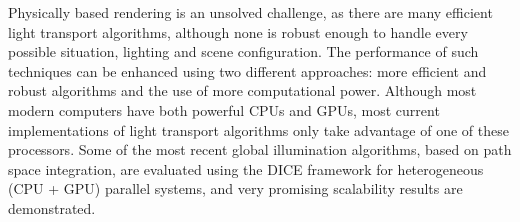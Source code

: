 Physically based rendering is an unsolved challenge, as there are many efficient light transport algorithms, although none is robust enough to handle every possible situation, lighting and scene configuration. The performance of such techniques can be enhanced using two different approaches: more efficient and robust algorithms and the use of more computational power. Although most modern computers have both powerful CPUs and GPUs, most current implementations of light transport algorithms only take advantage of one of these processors. Some of the most recent global illumination algorithms, based on path space integration, are evaluated using the DICE framework for heterogeneous (CPU + GPU) parallel systems, and very promising scalability results are demonstrated.